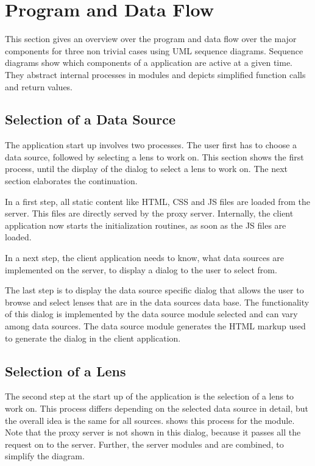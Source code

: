 \section{Program and Data Flow}
\label{sec:pd_flow}

This section gives an overview over the program and data flow over the major components for three non trivial cases using UML sequence diagrams.
Sequence diagrams show which components of a application are active at a given time.
They abstract internal processes in modules and depicts simplified function calls and return values.



\subsection{Selection of a Data Source}

The application start up involves two processes.
The user first has to choose a data source, followed by selecting a lens to work on.
This section shows the first process, until the display of the dialog to select a lens to work on.
The next section elaborates the continuation.

In a first step, all static content like HTML, CSS and JS files are loaded from the server.
This files are directly served by the proxy server.
Internally, the client application now starts the initialization routines, as soon as the JS files are loaded.

In a next step, the client application needs to know, what data sources are implemented on the server, to display a dialog to the user to select from.

The last step is to display the data source specific dialog that allows the user to browse and select lenses that are in the data sources data base.
The functionality of this dialog is implemented by the data source module selected and can vary among data sources.
The data source module generates the HTML markup used to generate the dialog in the client application.



\subsection{Selection of a Lens}

The second step at the start up of the application is the selection of a lens to work on.
This process differs depending on the selected data source in detail, but the overall idea is the same for all sources.
 shows this process for the \sw module.
Note that the proxy server is not shown in this dialog, because it passes all the request on to the server.
Further, the server modules  and  are combined, to simplify the diagram.

